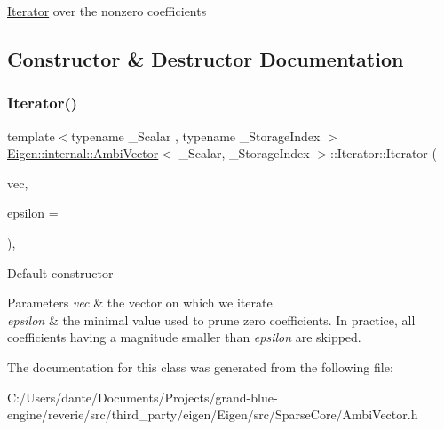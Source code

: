\mbox{\hyperlink{class_eigen_1_1internal_1_1_ambi_vector_1_1_iterator}{Iterator}} over the nonzero coefficients 

\subsection{Constructor \& Destructor Documentation}
\mbox{\label{class_eigen_1_1internal_1_1_ambi_vector_1_1_iterator_a2201eecfa8e104d9f2017e47c5f24583}} 
\subsubsection{\texorpdfstring{Iterator()}{Iterator()}}
{\footnotesize\ttfamily template$<$typename \+\_\+\+Scalar , typename \+\_\+\+Storage\+Index $>$ \\
\mbox{\hyperlink{class_eigen_1_1internal_1_1_ambi_vector}{Eigen\+::internal\+::\+Ambi\+Vector}}$<$ \+\_\+\+Scalar, \+\_\+\+Storage\+Index $>$\+::Iterator\+::\+Iterator (\begin{DoxyParamCaption}\item[{const \mbox{\hyperlink{class_eigen_1_1internal_1_1_ambi_vector}{Ambi\+Vector}} \&}]{vec,  }\item[{const Real\+Scalar \&}]{epsilon = {} }\end{DoxyParamCaption})\hspace{0.3cm}{\ttfamily [inline]}, {\ttfamily [explicit]}}

Default constructor 
\begin{DoxyParams}{Parameters}
{\em vec} & the vector on which we iterate \\
\hline
{\em epsilon} & the minimal value used to prune zero coefficients. In practice, all coefficients having a magnitude smaller than {\itshape epsilon} are skipped. \\
\hline
\end{DoxyParams}


The documentation for this class was generated from the following file\+:\begin{DoxyCompactItemize}
\item 
C\+:/\+Users/dante/\+Documents/\+Projects/grand-\/blue-\/engine/reverie/src/third\+\_\+party/eigen/\+Eigen/src/\+Sparse\+Core/Ambi\+Vector.\+h\end{DoxyCompactItemize}
